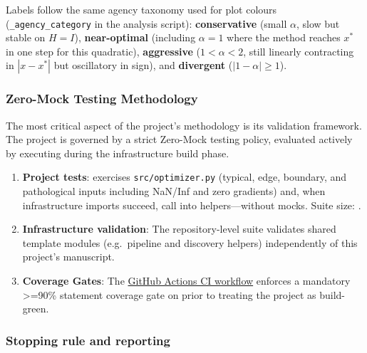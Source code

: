 \documentclass[
]{article}
\providecommand{\tightlist}{%
  \setlength{\itemsep}{0pt}\setlength{\parskip}{0pt}}
\begin{document}
Labels follow the same agency taxonomy used for plot colours
(\texttt{\_agency\_category} in the analysis script):
\textbf{conservative} (small \(\alpha\), slow but stable on \(H=I\)),
\textbf{near-optimal} (including \(\alpha=1\) where the method reaches
\(x^\ast\) in one step for this quadratic), \textbf{aggressive}
(\(1 < \alpha < 2\), still linearly contracting in \(|x-x^\ast|\) but
oscillatory in sign), and \textbf{divergent} (\(|1-\alpha| \geq 1\)).

\subsubsection{Zero-Mock Testing
Methodology}\label{zero-mock-testing-methodology}

The most critical aspect of the project's methodology is its validation
framework. The project is governed by a strict Zero-Mock testing policy,
evaluated actively by executing
 during
the infrastructure build phase.

\begin{enumerate}
\def\labelenumi{\arabic{enumi}.}
\tightlist
\item
  \textbf{Project tests}:
  \href{../tests/test_optimizer.py}{}
  exercises \texttt{src/optimizer.py} (typical, edge, boundary, and
  pathological inputs including NaN/Inf and zero gradients) and, when
  infrastructure imports succeed, call into
   helpers---without mocks. Suite
  size:
  \href{../../../docs/_generated/canonical_facts.md}{}.
\item
  \textbf{Infrastructure validation}: The repository-level
   suite validates shared template modules
  (e.g.~pipeline and discovery helpers) independently of this project's
  manuscript.
\item
  \textbf{Coverage Gates}: The
  \href{https://github.com/docxology/template/blob/main/.github/workflows/ci.yml}{GitHub
  Actions CI workflow} enforces a mandatory \texorpdfstring{\textgreater{}=}{>=}90\% statement coverage
  gate on  prior to
  treating the project as build-green.
\end{enumerate}

\subsubsection{Stopping rule and
reporting}\label{stopping-rule-and-reporting}
\end{document}
